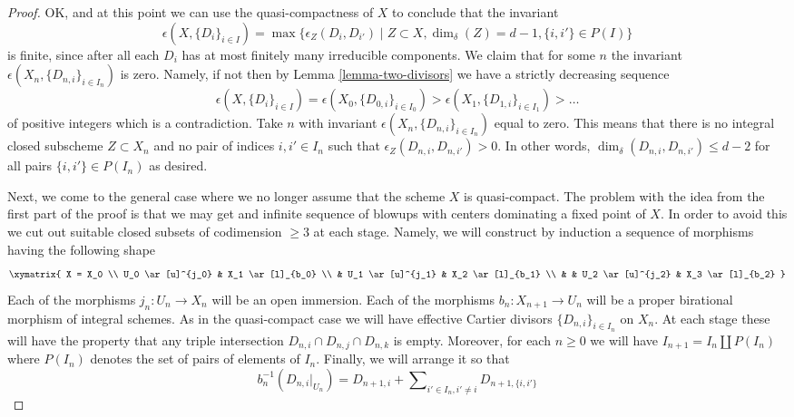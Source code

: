 \begin{proof}
\medskip\noindent
OK, and at this point we can use the quasi-compactness of $X$
to conclude that the invariant
\begin{equation}
\label{equation-invariant}
\epsilon(X, \{D_i\}_{i \in I}) =
\max\{\epsilon_Z(D_i, D_{i'}) \mid
Z \subset X,
\dim_\delta(Z) = d - 1,
\{i, i'\} \in P(I)\}
\end{equation}
is finite, since after all each $D_i$ has at most finitely many irreducible
components. We claim that for some $n$ the invariant
$\epsilon(X_n, \{D_{n, i}\}_{i \in I_n})$ is zero. Namely, if not then
by Lemma \ref{lemma-two-divisors} we have a strictly decreasing sequence
$$
\epsilon(X, \{D_i\}_{i \in I})
=
\epsilon(X_0, \{D_{0, i}\}_{i \in I_0})
>
\epsilon(X_1, \{D_{1, i}\}_{i \in I_1})
>
\ldots
$$
of positive integers which is a contradiction. Take $n$ with
invariant $\epsilon(X_n, \{D_{n, i}\}_{i \in I_n})$ equal to zero.
This means that there is no integral closed subscheme $Z \subset X_n$
and no pair of indices $i, i' \in I_n$
such that $\epsilon_Z(D_{n, i}, D_{n, i'}) > 0$.
In other words, $\dim_\delta(D_{n, i}, D_{n, i'}) \leq d - 2$ for
all pairs $\{i, i'\} \in P(I_n)$ as desired.

\medskip\noindent
Next, we come to the general case where we no longer assume that
the scheme $X$ is quasi-compact. The problem with the idea from
the first part of the proof is that we may get and infinite sequence
of blowups with centers dominating a fixed point of $X$. In order to
avoid this we cut out suitable closed subsets of codimension $\geq 3$
at each stage. Namely, we will construct by induction
a sequence of morphisms having the following shape
$$
\xymatrix{
X = X_0 \\
U_0 \ar[u]^{j_0} & X_1 \ar[l]_{b_0} \\
 & U_1 \ar[u]^{j_1} & X_2 \ar[l]_{b_1} \\
 & & U_2 \ar[u]^{j_2} & X_3 \ar[l]_{b_2}
}
$$
Each of the morphisms $j_n : U_n \to X_n$ will be an open immersion.
Each of the morphisms $b_n : X_{n + 1} \to U_n$ will be a proper birational
morphism of integral schemes. As in the quasi-compact case we will have
effective Cartier divisors $\{D_{n, i}\}_{i \in I_n}$ on $X_n$.
At each stage these will have the property that any triple
intersection $D_{n, i} \cap D_{n, j} \cap D_{n, k}$ is empty.
Moreover, for each $n \geq 0$ we will have
$I_{n + 1} = I_n \amalg P(I_n)$ where $P(I_n)$ denotes
the set of pairs of elements of $I_n$.
Finally, we will arrange it so that
$$
b_n^{-1}(D_{n, i}|_{U_n}) = D_{n + 1, i} +
\sum\nolimits_{i' \in I_n, i' \not = i} D_{n + 1, \{i, i'\}}
$$


\end{proof}
